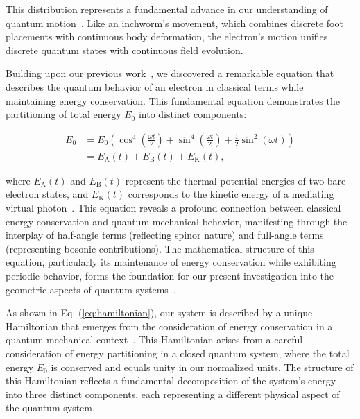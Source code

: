 \documentclass[%
 reprint,
 amsmath,amssymb,
 aps,
]{revtex4-1}
\numberwithin{equation}{section}%
\begin{document}
This distribution represents a fundamental advance in our understanding of quantum motion~\cite{shapere1989}. Like an inchworm's movement, which combines discrete foot placements with continuous body deformation, the electron's motion unifies discrete quantum states with continuous field evolution.


Building upon our previous work~\cite{hanamura2018, hanamura2023}, we discovered a remarkable equation that describes the quantum behavior of an electron in classical terms while maintaining energy conservation. This fundamental equation demonstrates the partitioning of total energy $E_0$ into distinct components:

\begin{equation}
\begin{split}
E_{0} &= E_{0} \left( \cos^{4} \left( \frac{\omega t}{2} \right) + \sin^{4} \left( \frac{\omega t}{2} \right) + \frac{1}{2} \sin^{2} (\omega t) \right) \\
      &= E_{\mathrm{A}}(t) + E_{\mathrm{B}}(t)
      + E_{\mathrm{K}}(t),
\end{split}
\label{eq:energy_partition}
\end{equation}

\noindent where $E_{\mathrm{A}}(t)$ and $E_{\mathrm{B}}(t)$ represent the thermal potential energies of two bare electron states, and $E_{\mathrm{K}}(t)$ corresponds to the kinetic energy of a mediating virtual photon~\cite{hanamura2018}. This equation reveals a profound connection between classical energy conservation and quantum mechanical behavior, manifesting through the interplay of half-angle terms (reflecting spinor nature) and full-angle terms (representing bosonic contributions). The mathematical structure of this equation, particularly its maintenance of energy conservation while exhibiting periodic behavior, forms the foundation for our present investigation into the geometric aspects of quantum systems~\cite{shapere1989}.

As shown in Eq. (\ref{eq:hamiltonian}), our system is described by a unique Hamiltonian that emerges from the consideration of energy conservation in a quantum mechanical context~\cite{weinberg1995}. This Hamiltonian arises from a careful consideration of energy partitioning in a closed quantum system, where the total energy $E_0$ is conserved and equals unity in our normalized units. The structure of this Hamiltonian reflects a fundamental decomposition of the system's energy into three distinct components, each representing a different physical aspect of the quantum system.
\end{document}
